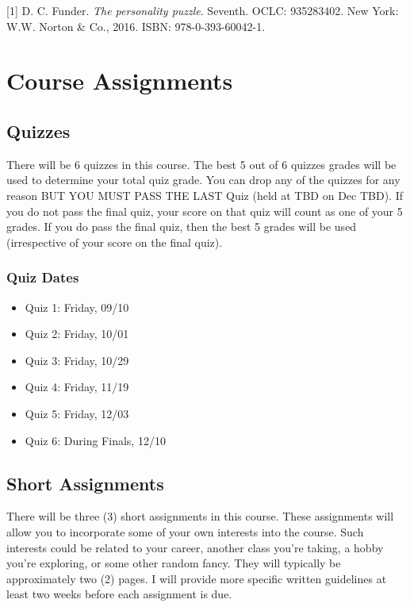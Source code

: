 {[}1{]} D. C. Funder. \emph{The personality puzzle}. Seventh. OCLC: 935283402.
New York: W.W. Norton \& Co., 2016. ISBN: 978-0-393-60042-1.

\hypertarget{course-assignments}{%
\section*{Course Assignments}\label{course-assignments}}


\hypertarget{quizzes}{%
\subsection*{Quizzes}\label{quizzes}}


There will be 6 quizzes in this course. The best 5 out of 6 quizzes grades will be used to determine your total quiz grade. You can drop any of the quizzes for any reason BUT YOU MUST PASS THE LAST Quiz (held at TBD on Dec TBD). If you do not pass the final quiz, your score on that quiz will count as one of your 5 grades. If you do pass the final quiz, then the best 5 grades will be used (irrespective of your score on the final quiz).

\hypertarget{quiz-dates}{%
\subsubsection*{Quiz Dates}\label{quiz-dates}}


\begin{itemize}
\item
  Quiz 1: Friday, 09/10
\item
  Quiz 2: Friday, 10/01
\item
  Quiz 3: Friday, 10/29
\item
  Quiz 4: Friday, 11/19
\item
  Quiz 5: Friday, 12/03
\item
  Quiz 6: During Finals, 12/10
\end{itemize}

\hypertarget{short-assignments}{%
\subsection*{Short Assignments}\label{short-assignments}}


There will be three (3) short assignments in this course. These assignments will allow you to incorporate some of your own interests into the course. Such interests could be related to your career, another class you're taking, a hobby you're exploring, or some other random fancy. They will typically be approximately two (2) pages. I will provide more specific written guidelines at least two weeks before each assignment is due.

